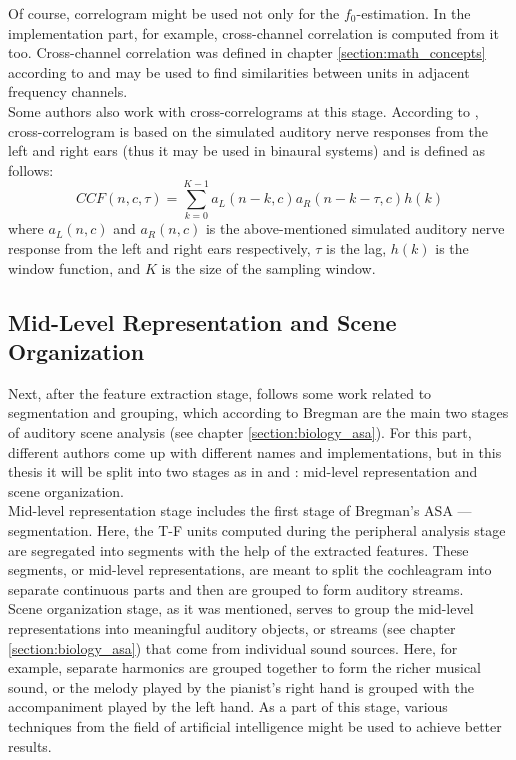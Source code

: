 Of course, correlogram might be used not only for the $f_0$-estimation. In the implementation part, for example, cross-channel correlation is computed from it too. Cross-channel correlation was defined in chapter \ref{section:math_concepts} according to \cite{Wang2012} and may be used to find similarities between units in adjacent frequency channels.\\

Some authors also work with cross-correlograms at this stage. According to \cite{Wang2006}, cross-correlogram is based on the simulated auditory nerve responses from the left and right ears (thus it may be used in binaural systems) and is defined as follows:
\begin{equation}
	CCF(n, c, \tau) = \sum_{k=0}^{K-1} a_L(n-k, c) a_R(n-k-\tau, c) h(k)
\end{equation}
where $a_L(n, c)$ and $a_R(n, c)$ is the above-mentioned simulated auditory nerve response from the left and right ears respectively, $\tau$ is the lag, $h(k)$ is the window function, and $K$ is the size of the sampling window.

\subsection{Mid-Level Representation and Scene Organization}\label{subsection:casa_segmentation_and_grouping}

Next, after the feature extraction stage, follows some work related to segmentation and grouping, which according to Bregman are the main two stages of auditory scene analysis (see chapter \ref{section:biology_asa}). For this part, different authors come up with different names and implementations, but in this thesis it will be split into two stages as in \cite{Wang2006} and \cite{Jasti2020}: mid-level representation and scene organization.\\

Mid-level representation stage includes the first stage of Bregman's ASA --- segmentation. Here, the T-F units computed during the peripheral analysis stage are segregated into segments with the help of the extracted features. These segments, or mid-level representations, are meant to split the cochleagram into separate continuous parts and then are grouped to form auditory streams.\\

Scene organization stage, as it was mentioned, serves to group the mid-level representations into meaningful auditory objects, or streams (see chapter \ref{section:biology_asa}) that come from individual sound sources. Here, for example, separate harmonics are grouped together to form the richer musical sound, or the melody played by the pianist's right hand is grouped with the accompaniment played by the left hand. As a part of this stage, various techniques from the field of artificial intelligence might be used to achieve better results.\\

